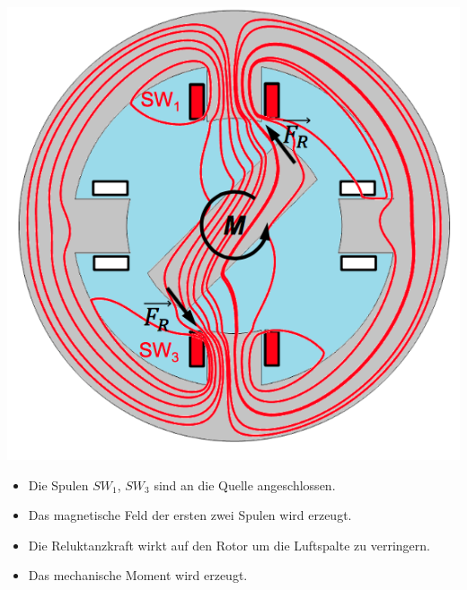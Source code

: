 \begin{minipage}{0.5 \linewidth}
\includegraphics[width = 0.7 \linewidth]{./Pics/VL67/WirkungRe2}
\end{minipage}
\begin{minipage}{0.5 \linewidth}
\begin{itemize}
\item Die Spulen $SW_1$, $SW_3$ sind an die Quelle angeschlossen.
\item Das magnetische Feld der ersten zwei Spulen wird erzeugt.
\item Die Reluktanzkraft wirkt auf den Rotor um die Luftspalte zu verringern.
\item Das mechanische Moment wird erzeugt. 
\end{itemize}
\end{minipage}

